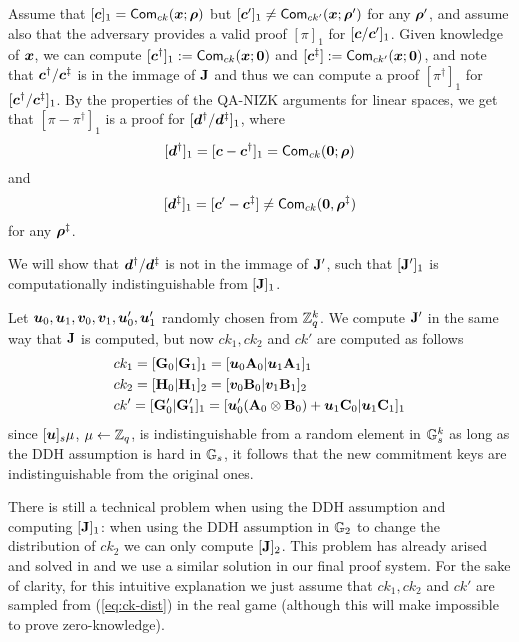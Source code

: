 Assume that $[{\boldsymbol{c}}]_1 = \mathsf{Com}_{ck}({\boldsymbol{x}};{\boldsymbol{\rho}})$ but $[{\boldsymbol{c}}']_1\neq \mathsf{Com}_{ck'}({\boldsymbol{x}};{\boldsymbol{\rho}}')$ for any ${\boldsymbol{\rho}}'$, and assume also that the adversary provides a valid proof $[\pi]_1$ for $[{\boldsymbol{c}}/{\boldsymbol{c}}']_1$. Given knowledge of ${\boldsymbol{x}}$, we can compute $[{\boldsymbol{c}}^\dag]_1:=\mathsf{Com}_{ck}({\boldsymbol{x}};{\boldsymbol{0}})$ and $[{\boldsymbol{c}}^\ddag]:=\mathsf{Com}_{ck'}({\boldsymbol{x}};{\boldsymbol{0}})$, and note that ${\boldsymbol{c}}^\dag/{\boldsymbol{c}}^\ddag$ is in the immage of $\mathbf{{J}}$ and thus we can compute a proof $[\pi^\dag]_1$ for $[{\boldsymbol{c}}^\dag/{\boldsymbol{c}}^\ddag]_1$. By the properties of the QA-NIZK arguments for linear spaces, we get that $[\pi-\pi^\dag]_1$ is a proof for $[{\boldsymbol{d}}^\dag/{\boldsymbol{d}}^\ddag]_1$, where
$$[{\boldsymbol{d}}^\dag]_1=[{\boldsymbol{c}}-{\boldsymbol{c}}^\dag]_1= \mathsf{Com}_{ck}({\boldsymbol{0}};{\boldsymbol{\rho}})$$ and 
$$[{\boldsymbol{d}}^\ddag]_1 = [{\boldsymbol{c}}'-{\boldsymbol{c}}^\ddag]\neq\mathsf{Com}_{ck}({\boldsymbol{0}},{\boldsymbol{\rho}}^\ddag)$$ for any ${\boldsymbol{\rho}}^\ddag$.

We will show that ${\boldsymbol{d}}^\dag/ {\boldsymbol{d}}^\ddag$ is not in the immage of $\mathbf{{J}}'$, such that $[\mathbf{{J}}']_1$ is computationally indistinguishable from $[\mathbf{{J}}]_1$.

Let ${\boldsymbol{u}}_0,{\boldsymbol{u}}_1,{\boldsymbol{v}}_0,{\boldsymbol{v}}_1,{\boldsymbol{u}}'_0,{\boldsymbol{u}}'_1$ randomly chosen from $\mathbb{Z}_q^k$. We compute $\mathbf{{J}}'$ in the same way that $\mathbf{{J}}$ is computed, but now $ck_1,ck_2$ and $ck'$ are computed as follows
\begin{align}
&ck_1 = [\mathbf{{G}}_0|\mathbf{{G}}_1]_1 = [{\boldsymbol{u}}_0\mathbf{{A}}_{0}|{\boldsymbol{u}}_1\mathbf{{A}}_1]_1 \nonumber \\
&ck_2 = [\mathbf{{H}}_0|\mathbf{{H}}_1]_2 = [{\boldsymbol{v}}_0\mathbf{{B}}_{0}|{\boldsymbol{v}}_1\mathbf{{B}}_1]_2 \nonumber \\
&ck' =  [\mathbf{{G}}'_0|\mathbf{{G}}'_1]_1 = [{\boldsymbol{u}}'_0(\mathbf{{A}}_0\otimes\mathbf{{B}}_0) + {\boldsymbol{u}}_1\mathbf{{C}}_0|{\boldsymbol{u}}_1\mathbf{{C}}_1]_1 \label{eq:ck-dist}
\end{align}
since $[{\boldsymbol{u}}]_s\mu$, $\mu\gets \mathbb{Z}_q$, is indistinguishable from a random element in $\mathbb{G}_s^k$ as long as the DDH assumption is hard in $\mathbb{G}_s$, it follows that the new commitment keys are indistinguishable from the original ones.

There is still a technical problem when using the DDH assumption and computing $[\mathbf{{J}}]_1$: when using the DDH assumption in $\mathbb{G}_2$ to change the distribution of $ck_2$ we can only compute $[\mathbf{{J}}]_2$. This problem has already arised and solved in \cite{AC:GonHevRaf15} and we use a similar solution in our final proof system. For the sake of clarity, for this intuitive explanation we just assume that $ck_1,ck_2$ and $ck'$ are sampled from (\ref{eq:ck-dist}) in the real game (although this will make impossible to prove zero-knowledge).

